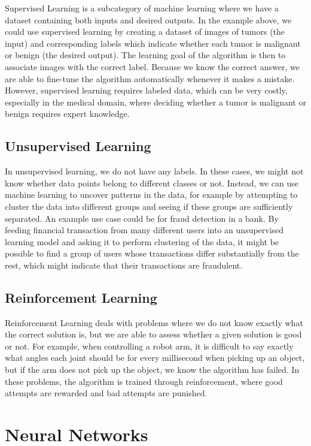 \documentclass[UKenglish]{uiomasterthesis} %
\theoremstyle{definition}
\begin{document}
Supervised Learning is a subcategory of machine learning where we have a dataset containing both inputs and desired outputs. In the example above, we could use supervised learning by creating a dataset of images of tumors (the input) and corresponding labels which indicate whether each tumor is malignant or benign (the desired output). The learning goal of the algorithm is then to associate images with the correct label. Because we know the correct answer, we are able to fine-tune the algorithm automatically whenever it makes a mistake. However, supervised learning requires labeled data, which can be very costly, especially in the medical domain, where deciding whether a tumor is malignant or benign requires expert knowledge.

\subsection{Unsupervised Learning}

In unsupervised learning, we do not have any labels. In these cases, we might not know whether data points belong to different classes or not. Instead, we can use machine learning to uncover patterns in the data, for example by attempting to cluster the data into different groups and seeing if these groups are sufficiently separated. An example use case could be for fraud detection in a bank. By feeding financial transaction from many different users into an unsupervised learning model and asking it to perform clustering of the data, it might be possible to find a group of users whose transactions differ substantially from the rest, which might indicate that their transactions are fraudulent.

\subsection{Reinforcement Learning}

Reinforcement Learning deals with problems where we do not know exactly what the correct solution is, but we are able to assess whether a given solution is good or not. For example, when controlling a robot arm, it is difficult to say exactly what angles each joint should be for every millisecond when picking up an object, but if the arm does not pick up the object, we know the algorithm has failed. In these problems, the algorithm is trained through reinforcement, where good attempts are rewarded and bad attempts are punished.

\section{Neural Networks}
\end{document}
